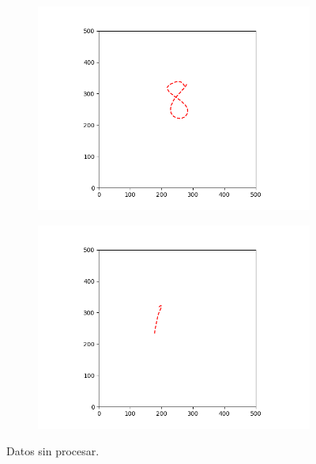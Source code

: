 \documentclass[12pt,a4paper]{article}
\begin{document}
\begin{figure}[H]
	\centering
	\begin{subfigure}[b]{0.4\textwidth}

		\includegraphics[width=\textwidth]{images/digito8raw.png}
		\caption[Digito ocho recogido por la tableta]{}
		\label{fig:digito8Raw}
	\end{subfigure}
	\begin{subfigure}[b]{0.4\textwidth}

	\includegraphics[width=\textwidth]{images/digito1Raw.png}
	\caption[Digito uno recogido por la tableta y sin procesar]{}
	\label{fig:digito1Raw}
	\end{subfigure}
	\caption[Digito ocho y uno recogidos por la tableta]{Datos sin procesar.}
\end{figure}
\end{document}
